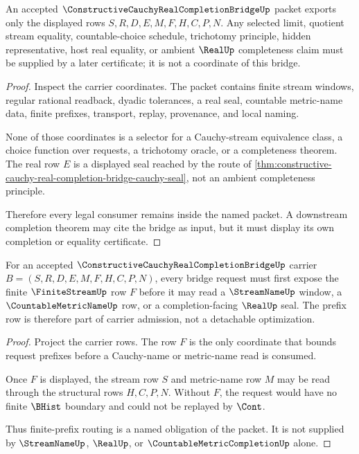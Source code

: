 \begin{theorem}
\label{thm:constructive-cauchy-real-completion-bridge-nonescape}
An accepted $\ConstructiveCauchyRealCompletionBridgeUp$ packet exports only the displayed rows $S,R,D,E,M,F,H,C,P,N$. Any selected limit, quotient stream equality, countable-choice schedule, trichotomy principle, hidden representative, host real equality, or ambient $\RealUp$ completeness claim must be supplied by a later certificate; it is not a coordinate of this bridge.
\end{theorem}
\begin{proof}
Inspect the carrier coordinates. The packet contains finite stream windows, regular rational readback, dyadic tolerances, a real seal, countable metric-name data, finite prefixes, transport, replay, provenance, and local naming.

None of those coordinates is a selector for a Cauchy-stream equivalence class, a choice function over requests, a trichotomy oracle, or a completeness theorem. The real row $E$ is a displayed seal reached by the route of \autoref{thm:constructive-cauchy-real-completion-bridge-cauchy-seal}, not an ambient completeness principle.

Therefore every legal consumer remains inside the named packet. A downstream completion theorem may cite the bridge as input, but it must display its own completion or equality certificate.
\end{proof}

\begin{theorem}
\label{thm:constructive-cauchy-real-completion-bridge-finite-prefix}
For an accepted $\ConstructiveCauchyRealCompletionBridgeUp$ carrier $B=(S,R,D,E,M,F,H,C,P,N)$, every bridge request must first expose the finite $\FiniteStreamUp$ row $F$ before it may read a $\StreamNameUp$ window, a $\CountableMetricNameUp$ row, or a completion-facing $\RealUp$ seal. The prefix row is therefore part of carrier admission, not a detachable optimization.
\end{theorem}
\begin{proof}
Project the carrier rows. The row $F$ is the only coordinate that bounds request prefixes before a Cauchy-name or metric-name read is consumed.

Once $F$ is displayed, the stream row $S$ and metric-name row $M$ may be read through the structural rows $H,C,P,N$. Without $F$, the request would have no finite $\BHist$ boundary and could not be replayed by $\Cont$.

Thus finite-prefix routing is a named obligation of the packet. It is not supplied by $\StreamNameUp$, $\RealUp$, or $\CountableMetricCompletionUp$ alone.
\end{proof}

